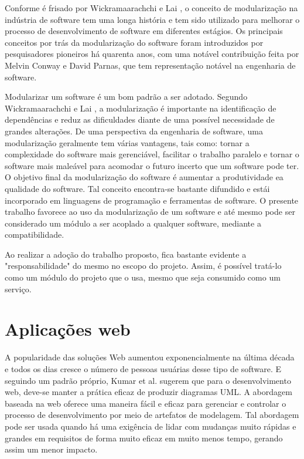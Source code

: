 Conforme é frisado por Wickramaarachchi e Lai \citep{7062705}, o conceito de modularização na indústria de software tem uma longa história e tem sido utilizado para melhorar o processo de desenvolvimento de software em diferentes estágios. Os principais conceitos por trás da modularização do software foram introduzidos por pesquisadores pioneiros há quarenta anos, com uma notável contribuição feita por Melvin Conway e David Parnas, que tem representação notável na engenharia de software.


Modularizar um software é um bom padrão a ser adotado. Segundo Wickramaarachchi e Lai \citep{7062705}, a modularização é importante na identificação de dependências e reduz as dificuldades diante de uma possível necessidade de grandes alterações. De uma perspectiva da engenharia de software, uma modularização geralmente tem várias vantagens, tais como: tornar a complexidade do software mais gerenciável, facilitar o trabalho paralelo e tornar o software mais maleável para acomodar o futuro incerto que um software pode ter. O objetivo final da modularização do software é aumentar a produtividade ea qualidade do software. Tal conceito encontra-se bastante difundido e estái incorporado em linguagens de programação e ferramentas de software. O presente trabalho favorece ao uso da modularização de um software e até mesmo pode ser considerado um módulo a ser acoplado a qualquer software, mediante a compatibilidade.


Ao realizar a adoção do trabalho proposto, fica bastante evidente a "responsabilidade" do mesmo no escopo do projeto. Assim, é possível tratá-lo como um módulo do projeto que o usa, mesmo que seja consumido como um serviço.


\section{Aplicações web}\label{sec:apps_web}


A popularidade das soluções Web aumentou exponencialmente na última década e todos os dias cresce o número de pessoas usuárias desse tipo de software. E seguindo um padrão próprio, Kumar et al. \citep{7813710} sugerem que para o desenvolvimento web, deve-se manter a prática eficaz de produzir diagramas UML. A abordagem baseada na web oferece uma maneira fácil e eficaz para gerenciar e controlar o processo de desenvolvimento por meio de artefatos de modelagem. Tal abordagem pode ser usada quando há uma exigência de lidar com mudanças muito rápidas e grandes em requisitos de forma muito eficaz em muito menos tempo, gerando assim um menor impacto. 


